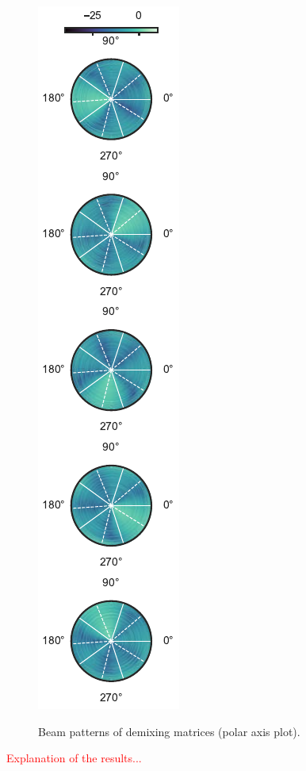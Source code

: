 \documentclass[sip,biber]{now-journal}
\newcommand{\todo}[1]{\textcolor{red}{#1}}
\begin{document}
\begin{figure}[t]
\begin{minipage}[t]{.3\linewidth}
    \centering\includegraphics{figures/plots/beam-pattern/polar_RTobs_rot.pdf}\label{fig:plot:bp:pol:obs}
  \end{minipage}
  \caption{Beam patterns of demixing matrices (polar axis plot).}%
  \label{fig:plots:bp:pol}
\end{figure}
\todo{Explanation of the results...}
\end{document}

